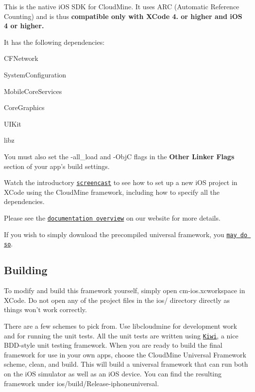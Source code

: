 This is the native i\-O\-S S\-D\-K for Cloud\-Mine. It uses A\-R\-C (Automatic Reference Counting) and is thus {\bfseries compatible only with X\-Code 4. or higher and i\-O\-S 4 or higher.}

It has the following dependencies\-:


\begin{DoxyItemize}
\item C\-F\-Network
\item System\-Configuration
\item Mobile\-Core\-Services
\item Core\-Graphics
\item U\-I\-Kit
\item libz
\end{DoxyItemize}

You must also set the {\ttfamily -\/all\-\_\-load} and {\ttfamily -\/\-Obj\-C} flags in the {\bfseries Other Linker Flags} section of your app's build settings.

Watch the introductory \href{http://cloudmine.me/developer_zone#ios/tutorials}{\tt screencast} to see how to set up a new i\-O\-S project in X\-Code using the Cloud\-Mine framework, including how to specify all the dependencies.

Please see the \href{http://cloudmine.me/developer_zone#ios/overview}{\tt documentation overview} on our website for more details.

If you wish to simply download the precompiled universal framework, you \href{https://github.com/cloudmine/cloudmine-ios/downloads}{\tt may do so}.

\subsection*{Building}

To modify and build this framework yourself, simply open {\ttfamily cm-\/ios.\-xcworkspace} in X\-Code. Do not open any of the project files in the {\ttfamily ios/} directory directly as things won't work correctly.

There are a few schemes to pick from. Use {\ttfamily libcloudmine} for development work and for running the unit tests. All the unit tests are written using \href{https://github.com/allending/Kiwi/wiki}{\tt Kiwi}, a nice B\-D\-D-\/style unit testing framework. When you are ready to build the final framework for use in your own apps, choose the {\ttfamily Cloud\-Mine Universal Framework} scheme, clean, and build. This will build a universal framework that can run both on the i\-O\-S simulator as well as an i\-O\-S device. You can find the resulting framework under {\ttfamily ios/build/\-Release-\/iphoneuniversal}.

